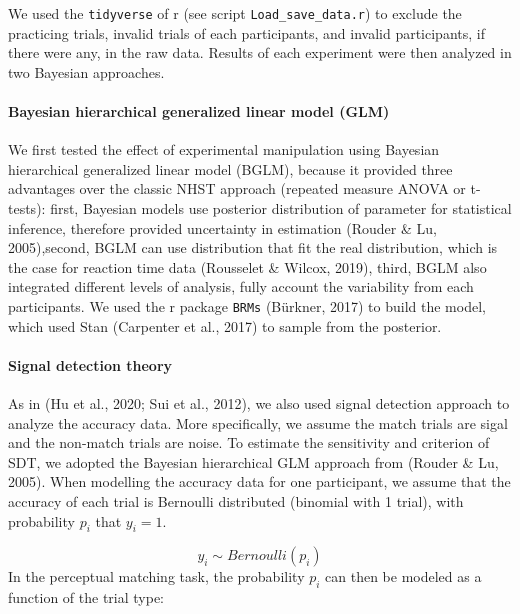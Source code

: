 \documentclass[
  english,
  man]{apa6}
\let\oldparagraph\paragraph
\renewcommand{\paragraph}[1]{\oldparagraph{#1}\mbox{}}
\begin{document}
We used the \texttt{tidyverse} of r (see script \texttt{Load\_save\_data.r}) to exclude the practicing trials, invalid trials of each participants, and invalid participants, if there were any, in the raw data. Results of each experiment were then analyzed in two Bayesian approaches.

\hypertarget{bayesian-hierarchical-generalized-linear-model-glm}{%
\paragraph{Bayesian hierarchical generalized linear model (GLM)}\label{bayesian-hierarchical-generalized-linear-model-glm}}

We first tested the effect of experimental manipulation using Bayesian hierarchical generalized linear model (BGLM), because it provided three advantages over the classic NHST approach (repeated measure ANOVA or t-tests): first, Bayesian models use posterior distribution of parameter for statistical inference, therefore provided uncertainty in estimation (Rouder \& Lu, 2005),second, BGLM can use distribution that fit the real distribution, which is the case for reaction time data (Rousselet \& Wilcox, 2019), third, BGLM also integrated different levels of analysis, fully account the variability from each participants. We used the r package \texttt{BRMs} (Bürkner, 2017) to build the model, which used Stan (Carpenter et al., 2017) to sample from the posterior.

\hypertarget{signal-detection-theory}{%
\paragraph{Signal detection theory}\label{signal-detection-theory}}

As in (Hu et al., 2020; Sui et al., 2012), we also used signal detection approach to analyze the accuracy data. More specifically, we assume the match trials are sigal and the non-match trials are noise. To estimate the sensitivity and criterion of SDT, we adopted the Bayesian hierarchical GLM approach from (Rouder \& Lu, 2005). When modelling the accuracy data for one participant, we assume that the accuracy of each trial is Bernoulli distributed (binomial with 1 trial), with probability \(p_{i}\) that \(y_{i} = 1\).

\[ y_{i} \sim Bernoulli(p_{i})\]
In the perceptual matching task, the probability \(p_{i}\) can then be modeled as a function of the trial type:
\end{document}
